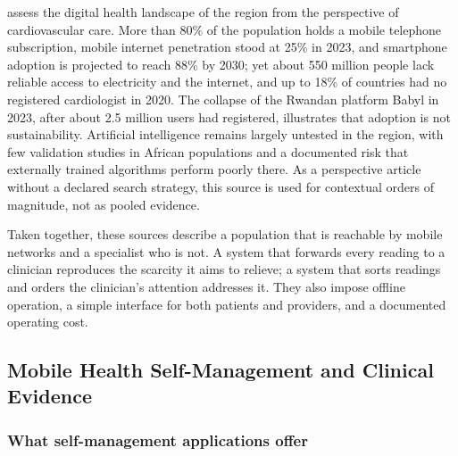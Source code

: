 \Textcite{segun2025} assess the digital health landscape of the region from the perspective of cardiovascular care. More than 80\% of the population holds a mobile telephone subscription, mobile internet penetration stood at 25\% in 2023, and smartphone adoption is projected to reach 88\% by 2030; yet about 550 million people lack reliable access to electricity and the internet, and up to 18\% of countries had no registered cardiologist in 2020. The collapse of the Rwandan platform Babyl in 2023, after about 2.5 million users had registered, illustrates that adoption is not sustainability. Artificial intelligence remains largely untested in the region, with few validation studies in African populations and a documented risk that externally trained algorithms perform poorly there. As a perspective article without a declared search strategy, this source is used for contextual orders of magnitude, not as pooled evidence.

Taken together, these sources describe a population that is reachable by mobile networks and a specialist who is not. A system that forwards every reading to a clinician reproduces the scarcity it aims to relieve; a system that sorts readings and orders the clinician's attention addresses it. They also impose offline operation, a simple interface for both patients and providers, and a documented operating cost.

\subsection{Mobile Health Self-Management and Clinical Evidence}\label{sec:outpatient}\label{sec:evidence}

\subsubsection{What self-management applications offer}\label{sec:apps}\label{sec:bct}

